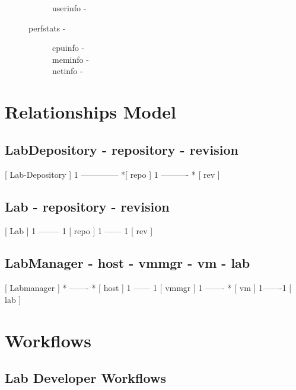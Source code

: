 \documentclass[11pt]{article}
\begin{document}
\begin{description}
\begin{description}
\begin{description}
\item [userinfo -]
\end{description}

\item [perfstats -]

\begin{description}
\item [cpuinfo -]
\item [meminfo -]
\item [netinfo -]
\end{description}

\end{description}

\end{description}
\section{Relationships Model}
\label{sec-2}


\subsection{LabDepository - repository - revision}
\label{sec-2.1}


 [ Lab-Depository ] 1 -------------- *[ repo ] 1 ---------- * [ rev ]

\subsection{Lab - repository - revision}
\label{sec-2.2}


 [ Lab ] 1 -------- 1 [ repo ] 1 ------ 1 [ rev ]

\subsection{LabManager - host - vmmgr - vm - lab}
\label{sec-2.3}


 [ Labmanager ] * ------- * [ host ] 1 ------ 1 [ vmmgr ] 1 ------- * [ vm ] 1-------1 [ lab ]
\section{Workflows}
\label{sec-3}

\subsection{Lab Developer Workflows}
\label{sec-3.1}
\end{document}
